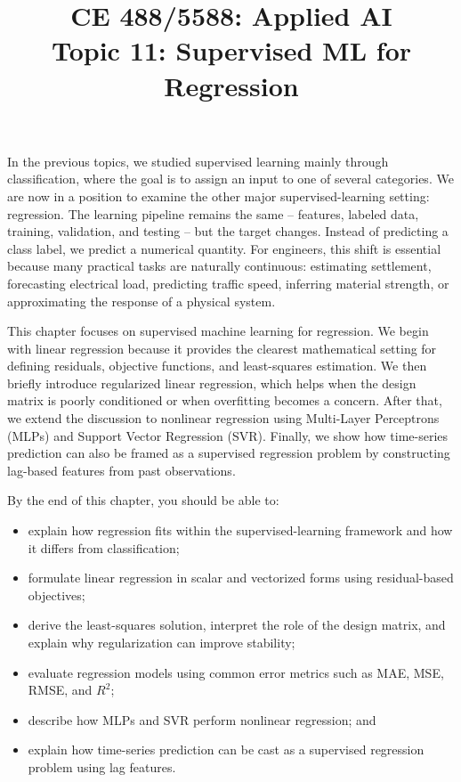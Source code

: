\documentclass[12pt]{article}
\begin{document}
\doublespacing

\title{CE 488/5588: Applied AI \\ \large Topic 11: Supervised ML for Regression}
\author{}
\date{}
\maketitle

In the previous topics, we studied supervised learning mainly through classification, where the goal is to assign an input to one of several categories. We are now in a position to examine the other major supervised-learning setting: regression. The learning pipeline remains the same -- features, labeled data, training, validation, and testing -- but the target changes. Instead of predicting a class label, we predict a numerical quantity. For engineers, this shift is essential because many practical tasks are naturally continuous: estimating settlement, forecasting electrical load, predicting traffic speed, inferring material strength, or approximating the response of a physical system.

This chapter focuses on supervised machine learning for regression. We begin with linear regression because it provides the clearest mathematical setting for defining residuals, objective functions, and least-squares estimation. We then briefly introduce regularized linear regression, which helps when the design matrix is poorly conditioned or when overfitting becomes a concern. After that, we extend the discussion to nonlinear regression using Multi-Layer Perceptrons (MLPs) and Support Vector Regression (SVR). Finally, we show how time-series prediction can also be framed as a supervised regression problem by constructing lag-based features from past observations.

By the end of this chapter, you should be able to:
\begin{itemize}
    \item explain how regression fits within the supervised-learning framework and how it differs from classification;
    \item formulate linear regression in scalar and vectorized forms using residual-based objectives;
    \item derive the least-squares solution, interpret the role of the design matrix, and explain why regularization can improve stability;
    \item evaluate regression models using common error metrics such as MAE, MSE, RMSE, and $R^2$;
    \item describe how MLPs and SVR perform nonlinear regression; and
    \item explain how time-series prediction can be cast as a supervised regression problem using lag features.
\end{itemize}
\end{document}
